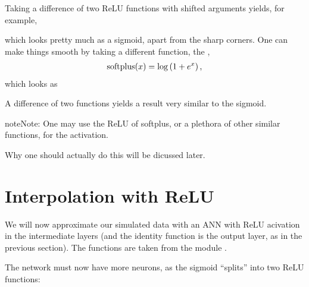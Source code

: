 \documentclass[letterpaper,10pt,english]{jupyterBook}
\begin{document}
\noindent{}

\sphinxAtStartPar
Taking a difference of two ReLU functions with shifted arguments yields, for example,

\noindent{}

\sphinxAtStartPar
which looks pretty much as a sigmoid, apart from the sharp corners. One can make things smooth by taking a different function, the ,
\begin{equation*}
\begin{split}
{\rm softplus}(x)=\log \left( 1+e^x \right ),
\end{split}
\end{equation*}
\sphinxAtStartPar
which looks as

\noindent{}

\sphinxAtStartPar
A difference of two  functions yields a result very similar to the sigmoid.

\noindent{}

\begin{sphinxadmonition}{note}{Note:}
\sphinxAtStartPar
One may use the ReLU of softplus, or a plethora of other similar functions, for the activation.
\end{sphinxadmonition}

\sphinxAtStartPar
Why one should actually do this will be dicussed later.


\section{Interpolation with ReLU}
\label{\detokenize{docs/rectification:interpolation-with-relu}}
\sphinxAtStartPar
We will now approximate our simulated data with an ANN with ReLU acivation in the intermediate layers (and the identity function is the output layer, as in the previous section). The functions are taken from the module .

\begin{sphinxVerbatim}[commandchars=\\\{\}]
    
\end{sphinxVerbatim}

\sphinxAtStartPar
The network must now have more neurons, as the sigmoid “splits” into two ReLU functions:
\end{document}
